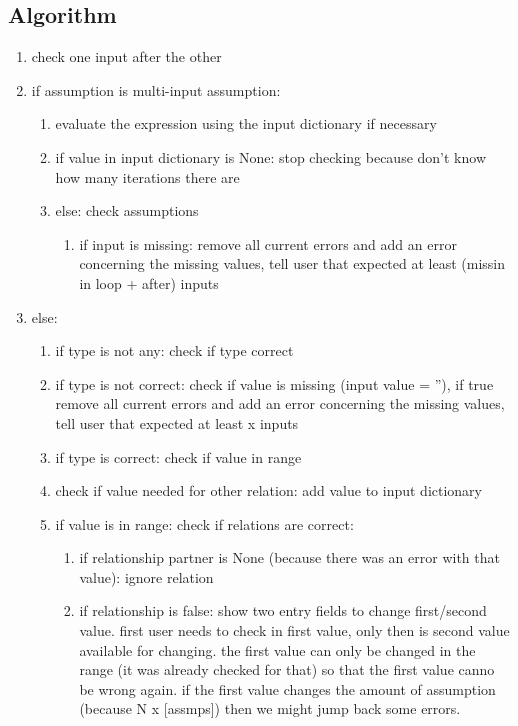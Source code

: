 \documentclass[11pt]{article}
\begin{document}
\subsection{Algorithm}

\begin{enumerate}
    \item check one input after the other
    \item if assumption is multi-input assumption:
    \begin{enumerate}
        \item evaluate the expression using the input dictionary if necessary
        \item if value in input dictionary is None: stop checking because don't know how many iterations there are
        \item else: check assumptions
        \begin{enumerate}
            \item if input is missing: remove all current errors and add an error concerning the missing values, tell user that expected at least (missin in loop + after) inputs
        \end{enumerate}
    \end{enumerate}
    \item else:
    \begin{enumerate}
        \item if type is not any: check if type correct
        \item if type is not correct: check if value is missing (input value = ''), if true remove all current errors and add an error concerning the missing values, tell user that expected at least x inputs
        \item if type is correct: check if value in range
        \item check if value needed for other relation: add value to input dictionary
        \item if value is in range: check if relations are correct:
        \begin{enumerate}
            \item if relationship partner is None (because there was an error with that value): ignore relation
            \item if relationship is false: show two entry fields to change first/second value. first user needs to check in first value, only then is second value available for changing. the first value can only be changed in the range (it was already checked for that) so that the first value canno be wrong again. if the first value changes the amount of assumption (because N x [assmps]) then we might jump back some errors.
        \end{enumerate}
    \end{enumerate}
\end{enumerate}
\end{document}
